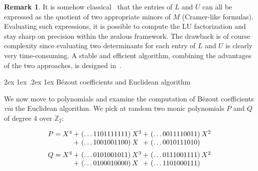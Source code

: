 \documentclass[11pt]{article}
\makeatletter
\numberwithin{equation}{section}
\numberwithin{figure}{section}
\renewcommand\paragraph{\@startsection{paragraph}{4}{\z@}%
                                    {2ex \@plus1ex \@minus.2ex}%
                                    {1ex}%
                                    {\normalfont\normalsize\bfseries}}
\theoremstyle{definition}
\newtheorem{rem}[theo]{Remark}
\newcommand{\Z}{\mathbb Z}
\makeatother
\begin{document}
\begin{rem}
It is somehow classical~\cite[\S 1.4]{Ho75} that the entries of $L$ and $U$ can 
all be expressed as the quotient of two appropriate minors of $M$ 
(Cramer-like formulas). Evaluating such expressions, it is possible to 
compute the LU factorization and stay sharp on precision within the 
zealous framework. The drawback is of course complexity since evaluating 
two determinants for each entry of $L$ and $U$ is clearly very 
time-consuming. A stable and efficient algorithm, combining the 
advantages of the two approaches, is designed in~\cite{Ca12}.
\end{rem}

\paragraph{Bézout coefficients and Euclidean algorithm}

We now move to polynomials and examine the computation of
Bézout coefficients \emph{via} the Euclidean algorithm. We pick at
random two monic polynomials $P$ and $Q$ of degree $4$ over $\Z_2$:

$$\begin{array}{r@{\hspace{0.2ex}}r@{\hspace{0.5ex}}l@{\hspace{0.2ex}}r@{\hspace{0.5ex}}l}
P = X^4 + {}& (\ldots 1101111111) & X^3 
        + {}& (\ldots 0011110011) & X^2 \\
      {}+ {}& (\ldots 1001001100) & X^{\phantom{1}} 
        + {}& (\ldots 0010111010) \medskip \\
Q = X^4 + {}& (\ldots 0101001011) & X^3 
        + {}& (\ldots 0111001111) & X^2 \\
      {}+ {}& (\ldots 0100010000) & X^{\phantom{1}} 
        + {}& (\ldots 1101000111) 
\end{array}$$
\end{document}
